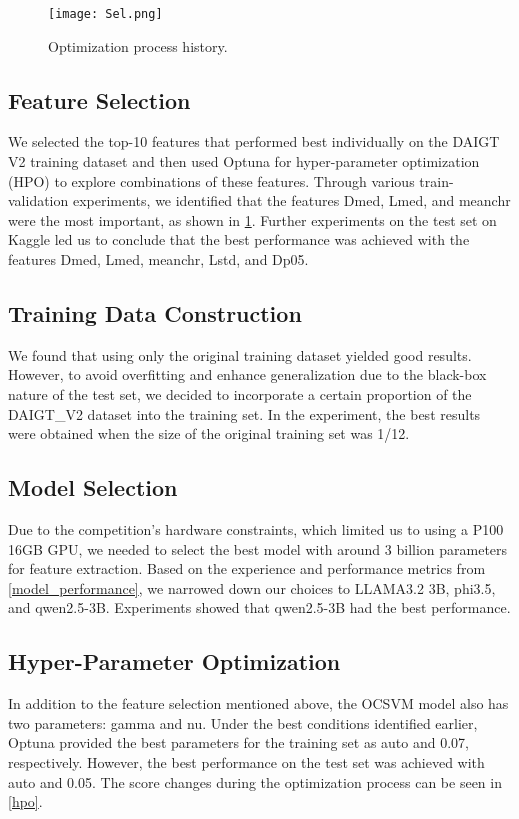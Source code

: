 \begin{figure}[t]
\vskip 0.1in
\begin{center}
\centerline{\texttt{[image: Sel.png]}}

\caption{Optimization process history.}

\label{sel}
\end{center}
\vskip -0.2in
\end{figure}

\subsection{Feature Selection}
We selected the top-10 features that performed best individually on the DAIGT V2 training dataset and then used Optuna for hyper-parameter optimization (HPO) to explore combinations of these features. Through various train-validation experiments, we identified that the features Dmed, Lmed, and meanchr were the most important, as shown in \cref{sel}. Further experiments on the test set on Kaggle led us to conclude that the best performance was achieved with the features Dmed, Lmed, meanchr, Lstd, and Dp05.

\subsection{Training Data Construction}
We found that using only the original training dataset yielded good results. However, to avoid overfitting and enhance generalization due to the black-box nature of the test set, we decided to incorporate a certain proportion of the DAIGT\_V2 dataset into the training set. In the experiment, the best results were obtained when the size of the original training set was 1/12.


\subsection{Model Selection}
Due to the competition's hardware constraints, which limited us to using a P100 16GB GPU, we needed to select the best model with around 3 billion parameters for feature extraction. Based on the experience \cite{} and performance metrics from \cref{model_performance}, we narrowed down our choices to LLAMA3.2 3B, phi3.5, and qwen2.5-3B. Experiments showed that qwen2.5-3B had the best performance.

\subsection{Hyper-Parameter Optimization}
In addition to the feature selection mentioned above, the OCSVM model also has two parameters: gamma and nu. Under the best conditions identified earlier, Optuna provided the best parameters for the training set as auto and 0.07, respectively. However, the best performance on the test set was achieved with auto and 0.05. The score changes during the optimization process can be seen in \cref{hpo}.

